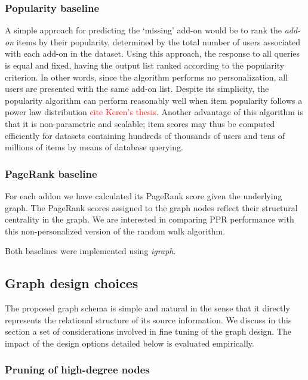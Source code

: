 \documentclass[11pt,oneside]{book}
\let\Oldsubsection\subsection
\renewcommand{\subsection}{\FloatBarrier\Oldsubsection}
\let\Oldsubsubsection\subsubsection
\renewcommand{\subsubsection}{\FloatBarrier\Oldsubsubsection}
\begin{document}
\subsubsection{Popularity baseline} 
A simple approach for predicting the `missing' add-on would be to rank the {\it add-on} items by their popularity, determined by the total number of users associated with each add-on in the dataset. Using this approach, the response to all queries is equal and fixed, having the output list ranked according to the popularity criterion. In other words, since the algorithm performs no personalization, all users are presented with the same
add-on list. Despite its simplicity, the popularity algorithm can perform reasonably well when item popularity follows a power law distribution  \textcolor{red}{cite Keren's thesis}. Another advantage of this algorithm is that it is non-parametric and scalable; item scores may thus be computed efficiently for datasets containing hundreds of thousands of users and tens of millions of items by means of database querying. 

\subsubsection{PageRank baseline} 
For each addon we have calculated its PageRank score given the underlying graph. The PageRank scores assigned to the graph nodes 
reflect their structural centrality in the graph. We are interested in comparing PPR performance with this non-personalized version of the random walk algorithm.

Both baselines were implemented using {\it igraph}. 

\subsection{Graph design choices}
\label{design}

The proposed graph schema is simple and natural in the sense that it directly represents the relational structure of its source information. We discuss in this section a set of considerations involved in fine tuning of the graph design. The impact of the design options detailed below is evaluated empirically.  

\subsubsection{Pruning of high-degree nodes} 
\end{document}
